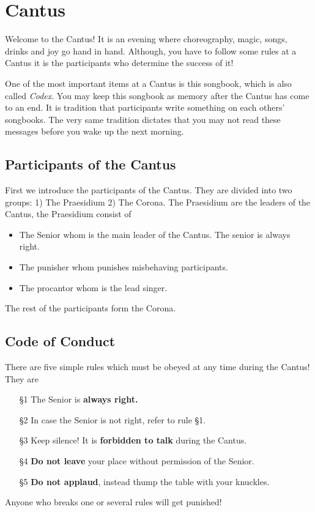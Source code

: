 \section{Cantus}
Welcome to the Cantus!
It is an evening where choreography, magic, songs, drinks and joy go hand in hand.
Although, you have to follow some rules at a Cantus it is the participants who determine the success of it!

One of the most important items at a Cantus is this songbook, which is also called \emph{Codex}.
You may keep this songbook as memory after the Cantus has come to an end.
It is tradition that participants write something on each others' songbooks. 
The very same tradition dictates that you may not read these messages before you wake up the next morning.

\subsection{Participants of the Cantus}
First we introduce the participants of the Cantus.
They are divided into two groups: 1) The Praesidium 2) The Corona.
The Praesidium are the leaders of the Cantus, the Praesidium consist of
\begin{itemize}
        \item The Senior whom is the main leader of the Cantus. The senior is always right.
        \item The punisher whom punishes misbehaving participants.
        \item The procantor whom is the lead singer.
\end{itemize}
The rest of the participants form the Corona.

\subsection{Code of Conduct}
There are five simple rules which must be obeyed at any time during the Cantus!
They are
\begin{itemize}
        \item[§1] The Senior is \textbf{always right.}
        \item[§2] In case the Senior is not right, refer to rule §1.
        \item[§3] Keep silence! It is \textbf{forbidden to talk} during the Cantus.
        \item[§4] \textbf{Do not leave} your place without permission of the Senior.
        \item[§5] \textbf{Do not applaud}, instead thump the table with your knuckles.
\end{itemize}
Anyone who breaks one or several rules will get punished!

